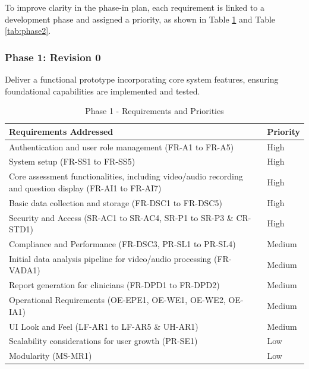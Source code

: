 \documentclass[12pt]{article}
\begin{document}
\newpage

To improve clarity in the phase-in plan, each requirement is linked to a development phase and assigned a priority, as shown in Table \ref{tab:phase1} and Table \ref{tab:phase2}.

\subsubsection*{Phase 1: Revision 0}

\hspace{2em}Deliver a functional prototype incorporating core system features, ensuring foundational capabilities are implemented and tested.

\begin{table}[H]
  \caption{Phase 1 - Requirements and Priorities}
  \label{tab:phase1}
  \begin{tabularx}{\textwidth}{|p{10cm}|X|}
  \hline
  \textbf{Requirements Addressed} & \textbf{Priority} \\
  \hline
  Authentication and user role management (FR-A1 to FR-A5) & High \\
  \hline
  System setup (FR-SS1 to FR-SS5) & High \\
  \hline
  Core assessment functionalities, including video/audio recording and question display (FR-AI1 to FR-AI7) & High \\
  \hline
  Basic data collection and storage (FR-DSC1 to FR-DSC5) & High \\
  \hline
  Security and Access (SR-AC1 to SR-AC4, SR-P1 to SR-P3 \& CR-STD1) & High \\
  \hline
  Compliance and Performance (FR-DSC3, PR-SL1 to PR-SL4) & Medium \\
  \hline
  Initial data analysis pipeline for video/audio processing (FR-VADA1) & Medium \\
  \hline
  Report generation for clinicians (FR-DPD1 to FR-DPD2) & Medium \\
  \hline
  Operational Requirements (OE-EPE1, OE-WE1, OE-WE2, OE-IA1) & Medium \\
  \hline
  UI Look and Feel (LF-AR1 to LF-AR5 \& UH-AR1) & Medium \\
  \hline
  Scalability considerations for user growth (PR-SE1) & Low \\
  \hline
  Modularity (MS-MR1) & Low \\
  \hline
  \end{tabularx}
\end{table}
\end{document}
